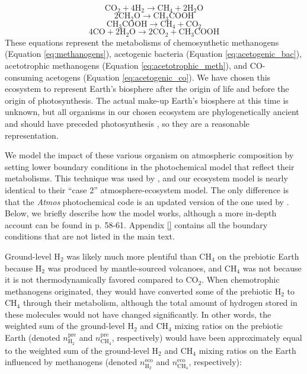 \begin{equation}
  \label{eq:methanogens}
  \mathrm{CO_2} + 4 \mathrm{H_2} \rightarrow \mathrm{CH_4} + 2 \mathrm{H_2O}
\end{equation}
\begin{equation}
  \label{eq:acetogenic_bac}
  2 \mathrm{CH_2O} \rightarrow \mathrm{CH_3COOH}
\end{equation}
\begin{equation}
  \label{eq:acetotrophic_meth}
  \mathrm{CH_3COOH} \rightarrow \mathrm{CH_4} + \mathrm{CO_2}
\end{equation}
\begin{equation}
  \label{eq:acetogenic_co}
  4 \mathrm{CO} + 2 \mathrm{H_2O} \rightarrow 2 \mathrm{CO_2} + \mathrm{CH_3COOH}
\end{equation}
These equations represent the metabolisms of chemosynthetic methanogens (Equation \eqref{eq:methanogens}), acetogenic bacteria (Equation \eqref{eq:acetogenic_bac}), acetotrophic methanogens (Equation \eqref{eq:acetotrophic_meth}), and CO-consuming acetogens (Equation \eqref{eq:acetogenic_co}). We have chosen this ecosystem to represent Earth's biosphere after the origin of life and before the origin of photosynthesis. The actual make-up Earth's biosphere at this time is unknown, but all organisms in our chosen ecosystem are phylogenetically ancient and should have preceded photosynthesis \citep{Adam_2018,Schonheit_2016,Wolfe_2018}, so they are a reasonable representation. 

We model the impact of these various organism on atmospheric composition by setting lower boundary conditions in the photochemical model that reflect their metabolisms. This technique was used by \citet{Kharecha_2005}, and our ecosystem model is nearly identical to their ``case 2'' atmosphere-ecosystem model. The only difference is that the \textit{Atmos} photochemical code is an updated version of the one used by \citet{Kharecha_2005}. Below, we briefly describe how the model works, although a more in-depth account can be found in \citet{Kharecha_2005} p. 58-61. 
Appendix \ref{} %
contains all the boundary conditions that are not listed in the main text.

Ground-level H$_2$ was likely much more plentiful than CH$_4$ on the prebiotic Earth because H$_2$ was produced by mantle-sourced volcanoes, and CH$_4$ was not because it is not thermodynamically favored compared to CO$_2$. When chemotrophic methanogens originated, they would have converted some of the prebiotic H$_2$ to CH$_4$ through their metabolism, although the total amount of hydrogen stored in these molecules would not have changed significantly. In other words, the weighted sum of the ground-level H$_2$ and CH$_4$ mixing ratios on the prebiotic Earth (denoted $n_\mathrm{H_2}^\mathrm{pre}$ and $n_\mathrm{CH_4}^\mathrm{pre}$, respectively) would have been approximately equal to the weighted sum of the ground-level H$_2$ and CH$_4$ mixing ratios on the Earth influenced by methanogens (denoted $n_\mathrm{H_2}^\mathrm{eco}$ and $n_\mathrm{CH_4}^\mathrm{eco}$, respectively):

